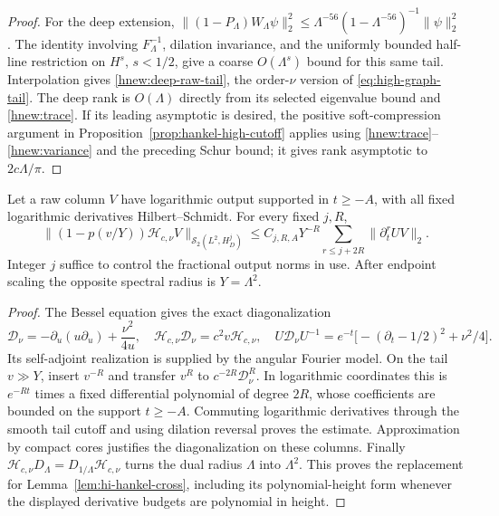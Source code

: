 \begin{proof}
For the deep extension,
$\|(1-P_\Lambda)W_\Lambda\psi\|_2^2
\le\Lambda^{-56}(1-\Lambda^{-56})^{-1}\|\psi\|_2^2$.
The identity involving $F_\Lambda^{-1}$, dilation invariance,
and the uniformly bounded half-line restriction on $H^s$,
$s<1/2$, give a coarse $O(\Lambda^s)$ bound for this same tail.
Interpolation gives \eqref{hnew:deep-raw-tail}, the
order-$\nu$ version of \eqref{eq:high-graph-tail}.
The deep rank is $O(\Lambda)$ directly from its selected eigenvalue
bound and \eqref{hnew:trace}.  If its leading asymptotic is desired,
the positive soft-compression argument in
Proposition~\ref{prop:hankel-high-cutoff} applies using
\eqref{hnew:trace}--\eqref{hnew:variance} and the preceding Schur bound;
it gives rank asymptotic to $2c\Lambda/\pi$.
\end{proof}

\begin{lemma}\label{hnew:cross}
Let a raw column $V$ have logarithmic output supported in $t\ge-A$,
with all fixed logarithmic derivatives Hilbert--Schmidt.
For every fixed $j,R$,
\[
 \|(1-p(v/Y))\mathcal H_{c,\nu}V\|_{\mathcal S_2(L^2,H_D^j)}
 \le C_{j,R,A}Y^{-R}\sum_{r\le j+2R}\|\partial_t^rUV\|_2.
\]
Integer $j$ suffice to control the fractional output norms in use.
After endpoint scaling the opposite spectral radius is $Y=\Lambda^2$.
\end{lemma}
\begin{proof}
The Bessel equation gives the exact diagonalization
\begin{equation}\label{hnew:differential}
 \mathcal D_\nu=-\partial_u(u\partial_u)+\frac{\nu^2}{4u},
 \quad \mathcal H_{c,\nu}\mathcal D_\nu=c^2v\mathcal H_{c,\nu},
 \quad
 U\mathcal D_\nu U^{-1}
 =e^{-t}\bigl[-(\partial_t-1/2)^2+\nu^2/4\bigr].
\end{equation}
Its self-adjoint realization is supplied by the angular Fourier
model.  On the tail $v\gg Y$, insert $v^{-R}$ and transfer $v^R$
to $c^{-2R}\mathcal D_\nu^R$.  In logarithmic coordinates this
is $e^{-Rt}$ times a fixed differential polynomial of degree $2R$,
whose coefficients are bounded on the support $t\ge-A$.
Commuting logarithmic derivatives through the smooth tail cutoff
and using dilation reversal proves the estimate.
Approximation by compact cores justifies the diagonalization on
these columns.  Finally
$\mathcal H_{c,\nu}D_\Lambda=D_{1/\Lambda}\mathcal H_{c,\nu}$
turns the dual radius $\Lambda$ into $\Lambda^2$.
This proves the replacement for Lemma~\ref{lem:hi-hankel-cross},
including its polynomial-height form whenever the displayed
derivative budgets are polynomial in height.
\end{proof}

